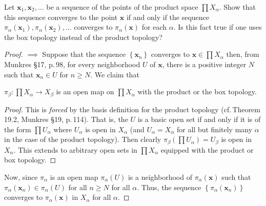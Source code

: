\newpage
\begin{problem}[Munkres \S19, p.\,118, \#6]
Let $\mathbf{x}_1,\mathbf{x}_2,...$ be a sequence of the points
of the product space $\prod X_\alpha$. Show that this sequence
converges to the point $\mathbf{x}$ if and only if the sequence
$\pi_\alpha(\mathbf{x}_1),\pi_\alpha(\mathbf{x}_2),...$ converges
to $\pi_\alpha(\mathbf{x})$ for each $\alpha$. Is this fact true
if one uses the box topology instead of the product topology?
\end{problem}
\begin{proof}
$\implies$ Suppose that the sequence
$\left\{\mathbf{x}_n\right\}$ converges to $\mathbf{x}\in\prod
X_\alpha$ then, from Munkres \S17, p.\,98, for every neighborhood
$U$ of $\mathbf{x}$, there is a positive integer $N$ such that
$\mathbf{x}_n\in U$ for $n\geq N$. We claim that
\begin{lemma}
$\pi_\beta\colon\prod X_\alpha\to X_\beta$ is an open map on
$\prod X_\alpha$ with the product or the box topology.
\end{lemma}
\begin{proof}
\renewcommand\qedsymbol{$\clubsuit$}
This is \emph{forced} by the basis definition for the product
topology (cf.\,Theorem 19.2, Munkres \S19, p.\,114). That is, the
$U$ is a basic open set if and only if it is of the form $\prod
U_\alpha$ where $U_\alpha$ is open in $X_\alpha$ (and
$U_\alpha=X_\alpha$ for all but finitely many $\alpha$ in the
case of the product topology). Then clearly $\pi_\beta(\prod
U_\alpha)=U_\beta$ is open in $X_\alpha$. This extends to
arbitrary open sets in $\prod X_\alpha$ equipped with the product
or box topology.
\end{proof}
\noindent Now, since $\pi_\alpha$ is an open map $\pi_\alpha(U)$
is a neighborhood of $\pi_\alpha(\mathbf{x})$ such that
$\pi_\alpha(\mathbf{x}_n)\in\pi_\alpha(U)$ for all $n\geq N$ for
all $\alpha$. Thus, the sequence
$\left\{\pi_\alpha(\mathbf{x}_n)\right\}$ converges to
$\pi_\alpha(\mathbf{x})$ in $X_\alpha$ for all $\alpha$.


\end{proof}
